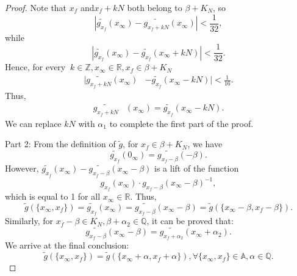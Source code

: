\documentclass[10pt,a4paper]{amsart}
\newcommand{\A}{\mathbb{A}}
\begin{document}
\begin{proof}
Note that \(x_f\) and\( x_f+kN\) both belong to $\beta +K_N$, so \[|\widetilde{g_{x_{f}}}(x_{\infty})-\widetilde{g_{x_{f}+kN}}(x_{\infty})|<\frac{1}{32},\]while 
\[
|\widetilde{g_{x_{f}}}(x_{\infty})-\widetilde{g_{x_{f}}}(x_{\infty}+kN)|<\frac{1}{32}.
\]
Hence, for every \(\ k\in \mathbb{Z},x_{\infty}\in \mathbb{R},x_{f}\in \beta+K_N\)
\begin{align*}
    |\widetilde{g_{x_{f}+kN}}(x_{\infty})&-\widetilde{{g}_{x_{f}}}(x_{\infty}-kN)|<\frac{1}{16}.
\end{align*}
Thus,
\begin{align*}
    \widetilde{g_{x_{f}+kN}}&(x_{\infty})=\widetilde{{g}_{x_{f}}}(x_{\infty}-kN).
\end{align*}
We can replace \( kN \) with \( \alpha_1 \) to complete the first part of the proof.

Part 2: From the definition of \( \tilde{g} \),  for  \( x_f \in\beta+ K_N \), we have\[\widetilde{g_{x_f}}(0_{\infty})=\widetilde{g_{x_f-\beta}}(-\beta).\]
However, \(\widetilde{g_{x_f}}(x_{\infty})-\widetilde{g_{x_f-\beta}}(x_{\infty}-\beta)\) is a lift of the function
\[g_{x_f}(x_{\infty})\cdot g_{x_f-\beta}(x_{\infty}-\beta)^{-1},\]
which is equal to 1 for all $x_{\infty}\in \mathbb{R}$. Thus,
\[\tilde{g}(\{x_\infty, x_f\})=\widetilde{g_{x_f}}(x_{\infty})=\widetilde{g_{x_f-\beta}}(x_{\infty}-\beta)=\tilde{g}(\{x_\infty-\beta, x_f-\beta\}).\]
Similarly, for $x_f-\beta\in K_N, \beta+\alpha_2\in \mathbb{Q}$, it can be proved that:
\[
\widetilde{g_{x_f-\beta}}(x_{\infty}-\beta)=\widetilde{g_{x_f+\alpha_2}}(x_{\infty}+\alpha_2).
\]
We arrive at the final conclusion:
\[
\tilde{g}(\{x_\infty, x_f\})=\tilde{g}(\{x_\infty+\alpha, x_f+\alpha\}), \forall \{x_\infty,x_f\}\in\A, \alpha\in \mathbb{Q}.
\]
\end{proof}
\end{document}
